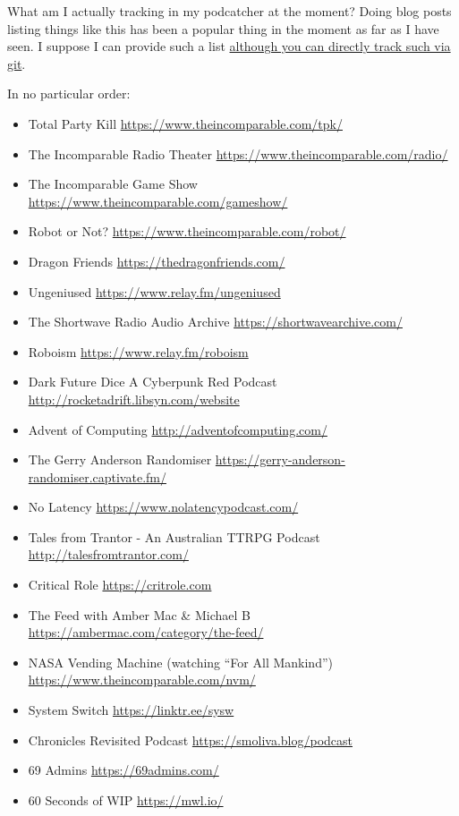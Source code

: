 What am I actually tracking in my podcatcher at the moment? Doing blog
posts listing things like this has been a popular thing in the moment as
far as I have seen. I suppose I can provide such a list
\href{https://code.launchpad.net/~skellat/+git/Podcasting}{although you
can directly track such via git}.

In no particular order:

\begin{itemize}
\tightlist
\item
  Total Party Kill \url{https://www.theincomparable.com/tpk/}
\item
  The Incomparable Radio Theater
  \url{https://www.theincomparable.com/radio/}
\item
  The Incomparable Game Show
  \url{https://www.theincomparable.com/gameshow/}
\item
  Robot or Not? \url{https://www.theincomparable.com/robot/}
\item
  Dragon Friends \url{https://thedragonfriends.com/}
\item
  Ungeniused \url{https://www.relay.fm/ungeniused}
\item
  The Shortwave Radio Audio Archive \url{https://shortwavearchive.com/}
\item
  Roboism \url{https://www.relay.fm/roboism}
\item
  Dark Future Dice \textbar{} A Cyberpunk Red Podcast
  \url{http://rocketadrift.libsyn.com/website}
\item
  Advent of Computing \url{http://adventofcomputing.com/}
\item
  The Gerry Anderson Randomiser
  \url{https://gerry-anderson-randomiser.captivate.fm/}
\item
  No Latency \url{https://www.nolatencypodcast.com/}
\item
  Tales from Trantor - An Australian TTRPG Podcast
  \url{http://talesfromtrantor.com/}
\item
  Critical Role \url{https://critrole.com}
\item
  The Feed with Amber Mac \& Michael B
  \url{https://ambermac.com/category/the-feed/}
\item
  NASA Vending Machine (watching ``For All Mankind'')
  \url{https://www.theincomparable.com/nvm/}
\item
  System Switch \url{https://linktr.ee/sysw}
\item
  Chronicles Revisited Podcast \url{https://smoliva.blog/podcast}
\item
  69 Admins \url{https://69admins.com/}
\item
  60 Seconds of WIP \url{https://mwl.io/}
\end{itemize}
